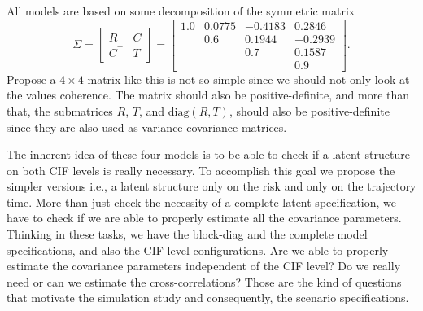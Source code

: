 All models are based on some decomposition of the symmetric matrix
\[
 \Sigma = \begin{bmatrix} R & C\\ C^{\top} & T \end{bmatrix}
        = \begin{bmatrix}
            1.0    &  0.0775 & -0.4183 &  0.2846\\
                   &  0.6    &  0.1944 & -0.2939\\
                   &         &  0.7    &  0.1587\\
                   &         &         &  0.9
          \end{bmatrix}.
\]
Propose a \(4\times4\) matrix like this is not so simple since we should
not only look at the values coherence. The matrix should also be
positive-definite, and more than that, the submatrices \(R\), \(T\),
and \(\text{diag}(R, T)\), should also be positive-definite since they
are also used as variance-covariance matrices.

The inherent idea of these four models is to be able to check if a
latent structure on both CIF levels is really necessary. To accomplish
this goal we propose the simpler versions i.e., a latent structure only
on the risk and only on the trajectory time. More than just check the
necessity of a complete latent specification, we have to check if we are
able to properly estimate all the covariance parameters. Thinking in
these tasks, we have the block-diag and the complete model
specifications, and also the CIF level configurations. Are we able to
properly estimate the covariance parameters independent of the CIF
level? Do we really need or can we estimate the cross-correlations?
Those are the kind of questions that motivate the simulation study and
consequently, the scenario specifications.

